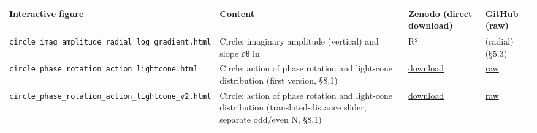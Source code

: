 \documentclass[
  a4paper,
]{article}
\newcounter{none} %
\begin{document}
{\def\LTcaptype{none} %
\begin{longtable}[]{@{}
  >{\raggedright\arraybackslash}p{}
  >{\raggedright\arraybackslash}p{}
  >{\raggedright\arraybackslash}p{}
  >{\raggedright\arraybackslash}p{}@{}}
\toprule\noalign{}
\begin{minipage}[b]{\linewidth}\raggedright
Interactive figure
\end{minipage} & \begin{minipage}[b]{\linewidth}\raggedright
Content
\end{minipage} & \begin{minipage}[b]{\linewidth}\raggedright
Zenodo (direct download)
\end{minipage} & \begin{minipage}[b]{\linewidth}\raggedright
GitHub (raw)
\end{minipage} \\
\midrule\noalign{}
\endhead
\bottomrule\noalign{}
\endlastfoot
\texttt{circle\_\allowbreak{}imag\_\allowbreak{}amplitude\_\allowbreak{}radial\_\allowbreak{}log\_\allowbreak{}gradient.html} & Circle:
imaginary amplitude (vertical) and slope ∂θ ln & R² & (radial) (§5.3) \\
\texttt{circle\_\allowbreak{}phase\_\allowbreak{}rotation\_\allowbreak{}action\_\allowbreak{}lightcone.html} & Circle:
action of phase rotation and light-cone distribution (first version,
§8.1) &
\href{https://zenodo.org/records/23384929/files/circle_phase_rotation_action_lightcone.html?download=1}{download}
&
\href{https://raw.githubusercontent.com/WurabeSeiji/ai-chat-logs-open/main/\%E6\%AC\%A1\%E5\%85\%83\%E3\%81\%AE\%E7\%94\%9F\%E6\%88\%90\%E6\%A7\%8B\%E9\%80\%A0/\%E5\%86\%86\%E5\%91\%A8\%E4\%BD\%8F\%E6\%B0\%91_\%E5\%85\%89\%E5\%86\%86\%E9\%8C\%90\%E8\%AA\%AD\%E5\%87\%BA\%E3\%81\%97_20261014/circle_phase_rotation_action_lightcone.html}{raw} \\
\texttt{circle\_\allowbreak{}phase\_\allowbreak{}rotation\_\allowbreak{}action\_\allowbreak{}lightcone\_\allowbreak{}v2.html} & Circle:
action of phase rotation and light-cone distribution
(translated-distance slider, separate odd/even N, §8.1) &
\href{https://zenodo.org/records/23384929/files/circle_phase_rotation_action_lightcone_v2.html?download=1}{download}
&
\href{https://raw.githubusercontent.com/WurabeSeiji/ai-chat-logs-open/main/\%E6\%AC\%A1\%E5\%85\%83\%E3\%81\%AE\%E7\%94\%9F\%E6\%88\%90\%E6\%A7\%8B\%E9\%80\%A0/\%E5\%86\%86\%E5\%91\%A8\%E4\%BD\%8F\%E6\%B0\%91_\%E5\%85\%89\%E5\%86\%86\%E9\%8C\%90\%E8\%AA\%AD\%E5\%87\%BA\%E3\%81\%97_20261014/circle_phase_rotation_action_lightcone_v2.html}{raw} \\

\end{longtable}}
\end{document}
